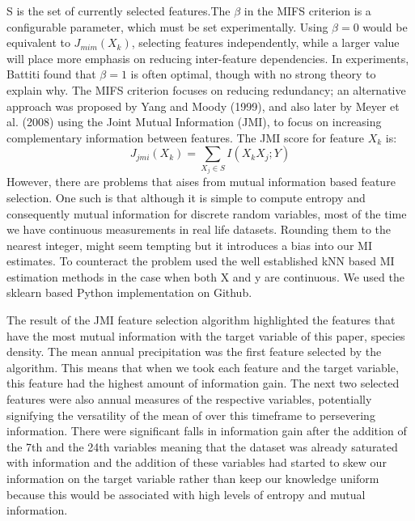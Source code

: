 \documentclass[prl,showpacs,superscriptaddress,twocolumn,longbibliography]{revtex4-1}
\begin{document}
S is the set of currently selected features.The $ \beta $ in the MIFS criterion is a configurable parameter, which must be set experimentally. Using $\beta  = 0 $ would be equivalent to $J_{mim}(X_k)$, selecting features independently, while a larger value will place more emphasis on reducing inter-feature dependencies. In experiments, Battiti found that $\beta  = 1$ is often optimal, though with no strong theory to explain why. The MIFS criterion focuses on reducing redundancy; an alternative approach was proposed by Yang and Moody (1999), and also later by Meyer et al. (2008) using the Joint Mutual Information (JMI), to focus on increasing complementary information between features\cite{Brown2012}. The JMI score for feature $X_k$ is:
\[ 
    J_{jmi}(X_k) =  \sum_{X_j\in S} I(X_kX_j;Y)
\]
However, there are problems that aises from mutual information based feature selection. One such is that although it is simple to compute entropy and consequently mutual information for discrete random variables, most of the time we have continuous measurements in real life datasets. Rounding them to the nearest integer, might seem tempting but it introduces a bias into our MI estimates. To counteract the problem used the well established kNN based MI estimation methods in the case when both X and y are continuous\cite{Daniel,Ross2014}. We used the sklearn based Python implementation on Github\cite{i9}.


The result of the JMI feature selection algorithm highlighted the features that have the most mutual information with the target variable of this paper, species density. The mean annual precipitation was the first feature selected by the algorithm. This means that when we took each feature and the target variable, this feature had the highest amount of information gain. The next two selected features were also annual measures of the respective variables, potentially signifying the versatility of the mean of over this timeframe to persevering information. There were significant falls in information gain after the addition of the 7th and the 24th variables meaning that the dataset was already saturated with information and the addition of these variables had started to skew our information on the target variable rather than keep our knowledge uniform because this would be associated with high levels of entropy and mutual information.
\end{document}
